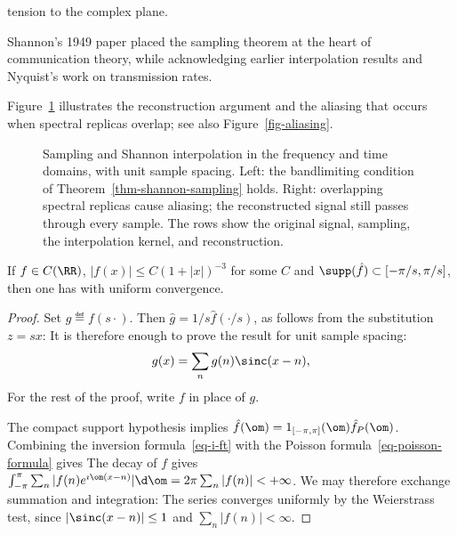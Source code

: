 tension to the complex plane.
 
Shannon's 1949 paper placed the sampling theorem at the heart of communication theory, while acknowledging earlier interpolation results and Nyquist's work on transmission rates.
 
Figure~\ref{fig-sampling-aliasing} illustrates the reconstruction argument and the aliasing that occurs when spectral replicas overlap; see also Figure~\ref{fig-aliasing}.

\begin{figure}[tbp]
\centering
{}
\caption{Sampling and Shannon interpolation in the frequency and time domains, with unit sample spacing. Left: the bandlimiting condition of Theorem~\ref{thm-shannon-sampling} holds. Right: overlapping spectral replicas cause aliasing; the reconstructed signal still passes through every sample. The rows show the original signal, sampling, the interpolation kernel, and reconstruction.}
\label{fig-sampling-aliasing}
\end{figure}





\begin{thm} \label{thm-shannon-sampling}
	If $f\in C(\RR)$, $|f(x)| \leq C(1+|x|)^{-3}$ for some $C$ and $\supp(\hat f) \subset [-\pi/s,\pi/s]$, then one has
	with uniform convergence.
\end{thm}

\begin{proof} 
	Set $g \eqdef f(s \cdot)$. Then $\hat g=1/s \hat f(\cdot/s)$, as follows from the substitution $z=s x$:
	It is therefore enough to prove the result for unit sample spacing:
	$$
		g(x) = \sum_n g(n) \sinc(x-n), 
	$$
	For the rest of the proof, write $f$ in place of $g$.
	 
	The compact support hypothesis implies $\hat f(\om) = 1_{[-\pi,\pi]}(\om) \hat f_P(\om)$.  
	Combining the inversion formula~\eqref{eq-i-ft} with the Poisson formula~\eqref{eq-poisson-formula} gives
	The decay of $f$ gives $\int_{-\pi}^\pi \sum_n |f(n) e^{\imath \om (x-n)}| \d \om = 2\pi\sum_n |f(n)| < +\infty$. We may therefore exchange summation and integration:
The series converges uniformly by the Weierstrass test, since $|\sinc(x-n)|\leq 1$ and $\sum_n|f(n)|<\infty$.
\end{proof}

